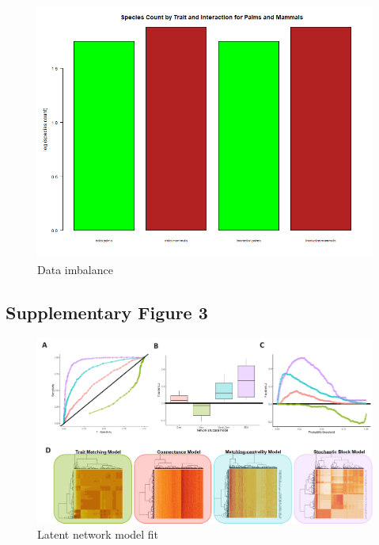 \documentclass[
]{agujournal2019}
\begin{document}
\begin{figure}[H]

{\centering \includegraphics[width=5.67708in,height=\textheight]{sup_figures/species_count_plot_AAS_style.png}

}

\caption{Data imbalance}

\end{figure}%

\subsection{Supplementary Figure 3}

\begin{figure}[H]

{\centering \includegraphics[width=5.67708in,height=\textheight]{sup_figures/Sup_modelsfit.jpg}

}

\caption{Latent network model fit}

\end{figure}%
\end{document}

